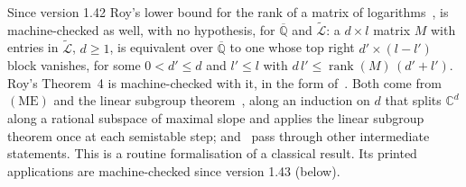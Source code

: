 \documentclass[11pt,a4paper]{article}
\theoremstyle{plain}
\theoremstyle{definition}
\newcommand{\Alg}{\overline{\mathbb{Q}}}
\newcommand{\aLogs}{\widetilde{\mathcal{L}}}
\begin{document}
Since version 1.42 Roy's lower bound for the rank of a matrix of logarithms~\cite[\S4, Corollary~1]{roy-1992},
\cite[Theorem~12.20 and Corollary~12.21]{waldschmidt-book} is machine-checked as well, with no hypothesis, for
$\Alg$ and $\aLogs$: a $d\times l$ matrix $M$ with entries in $\aLogs$, $d\geq1$, is equivalent over $\Alg$ to one
whose top right $d'\times(l-l')$ block vanishes, for some $0<d'\leq d$ and $l'\leq l$ with
$d\,l'\leq\operatorname{rank}(M)\,(d'+l')$. Roy's Theorem~4 is machine-checked with it, in the form
of~\cite[Proposition~11.19]{waldschmidt-book}. Both come from $(\mathrm{ME})$ and the linear subgroup
theorem~\cite[Theorem~11.21]{waldschmidt-book}, along an induction on $d$ that splits $\mathbb{C}^{d}$ along a
rational subspace of maximal slope and applies the linear subgroup theorem once at each semistable step;
\cite[\S11.6]{waldschmidt-book} and~\cite{roy-1992} pass through other intermediate statements. This is a routine
formalisation of a classical result. Its printed applications are machine-checked since version 1.43 (below).
\end{document}
